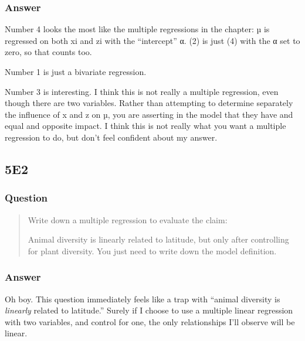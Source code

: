 \documentclass[
]{book}
\begin{document}
\hypertarget{answer-45}{%
\subsubsection*{Answer}\label{answer-45}}

Number 4 looks the most like the multiple regressions in the chapter: µ is regressed on both xi and zi with the ``intercept'' α. (2) is just (4) with the α set to zero, so that counts too.

Number 1 is just a bivariate regression.

Number 3 is interesting. I think this is not really a multiple regression, even though there are two variables. Rather than attempting to determine separately the influence of x and z on µ, you are asserting in the model that they have and equal and opposite impact. I think this is not really what you want a multiple regression to do, but don't feel confident about my answer.

\hypertarget{e2-3}{%
\subsection*{5E2}\label{e2-3}}

\hypertarget{question-46}{%
\subsubsection*{Question}\label{question-46}}

\begin{quote}
Write down a multiple regression to evaluate the claim:

Animal diversity is linearly related to latitude, but only after controlling for plant diversity. You just need to write down the model definition.
\end{quote}

\hypertarget{answer-46}{%
\subsubsection*{Answer}\label{answer-46}}

Oh boy. This question immediately feels like a trap with ``animal diversity is \emph{linearly} related to latitude.'' Surely if I choose to use a multiple linear regression with two variables, and control for one, the only relationships I'll observe will be linear.
\end{document}
